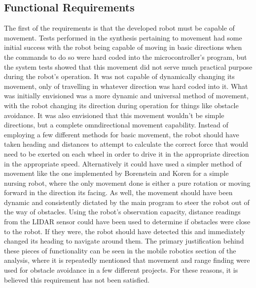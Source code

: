 		\subsection{Functional Requirements}
		The first of the requirements is that the developed robot must be capable of movement. Tests performed in the synthesis pertaining to movement had some initial success with the robot being capable of moving in basic directions when the commands to do so were hard coded into the microcontroller's program, but the system tests showed that this movement did not serve much practical purpose during the robot's operation. It was not capable of dynamically changing its movement, only of travelling in whatever direction was hard coded into it. What was initially envisioned was a more dynamic and universal method of movement, with the robot changing its direction during operation for things like obstacle avoidance. It was also envisioned that this movement wouldn't be simple directions, but a complete omndirectional movement capability. Instead of employing a few different methods for basic movement, the robot should have taken heading and distances to attempt to calculate the correct force that would need to be exerted on each wheel in order to drive it in the appropriate direction in the appropriate speed. Alternatively it could have used a simpler method of movement like the one implemented by Borenstein and Koren\cite{borenstein1988obstacle} for a simple nursing robot, where the only movement done is either a pure rotation or moving forward in the direction its facing. As well, the movement should have been dynamic and consistently dictated by the main program to steer the robot out of the way of obstacles. Using the robot's observation capacity, distance readings from the LIDAR sensor could have been used to determine if obstacles were close to the robot. If they were, the robot should have detected this and immediately changed its heading to navigate around them. The primary justification behind these pieces of functionality can be seen in the mobile robotics section of the analysis, where it is repeatedly mentioned that movement and range finding were used for obstacle avoidance in a few different projects. For these reasons, it is believed this requirement has not been satisfied.
		
